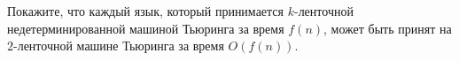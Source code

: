 Покажите, что каждый язык, который принимается $k$-ленточной недетерминированной машиной Тьюринга за время $f(n)$, может быть
принят на $2$-ленточной машине Тьюринга за время $O(f(n))$.